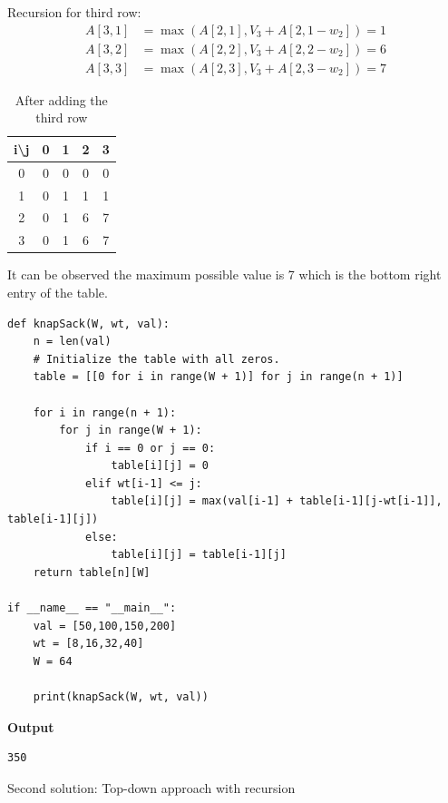 \documentclass[a4paper,11pt]{book}
\begin{document}
\noindent Recursion for third row:
\begin{align*}
    A[3,1] &= \max(A[2,1], V_3 + A[2,1-w_2]) = 1\\
    A[3,2] &= \max(A[2,2], V_3 + A[2,2-w_2]) = 6\\
    A[3,3] &= \max(A[2,3], V_3 + A[2,3-w_2]) = 7
\end{align*}

\begin{table}[ht]
\centering
\begin{tabular}{|c|c|c|c|c|}
\hline
i\textbackslash{}j & 0 & 1 & 2 & 3 \\ \hline
0                  & 0 & 0 & 0 & 0 \\ \hline
1                  & 0 & 1 & 1 & 1 \\ \hline
2                  & 0 & 1 & 6 & 7 \\ \hline
3                  & 0 & 1 & 6 & 7 \\ \hline
\end{tabular}
\caption{After adding the third row}
\end{table}

\noindent It can be observed the maximum possible value is 7 which is the bottom right entry of the table.

\begin{lstlisting}
def knapSack(W, wt, val): 
    n = len(val)
    # Initialize the table with all zeros.
    table = [[0 for i in range(W + 1)] for j in range(n + 1)] 
 
    for i in range(n + 1): 
        for j in range(W + 1): 
            if i == 0 or j == 0: 
                table[i][j] = 0
            elif wt[i-1] <= j: 
                table[i][j] = max(val[i-1] + table[i-1][j-wt[i-1]], table[i-1][j]) 
            else: 
                table[i][j] = table[i-1][j] 
    return table[n][W] 

if __name__ == "__main__":
    val = [50,100,150,200]
    wt = [8,16,32,40]
    W = 64
    
    print(knapSack(W, wt, val))
\end{lstlisting}
\textbf{Output}
\begin{lstlisting}
350
\end{lstlisting}

\noindent Second solution: Top-down approach with recursion
\end{document}
